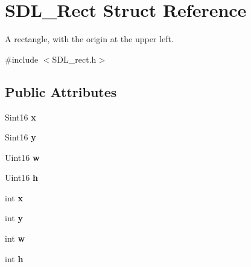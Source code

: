 \hypertarget{structSDL__Rect}{\section{S\+D\+L\+\_\+\+Rect Struct Reference}
\label{structSDL__Rect}
}


A rectangle, with the origin at the upper left.  




{\ttfamily \#include $<$S\+D\+L\+\_\+rect.\+h$>$}

\subsection*{Public Attributes}
\begin{DoxyCompactItemize}
\item 
\hypertarget{structSDL__Rect_a85418d94621dd6855805c4b5c7bf6482}{Sint16 {\bfseries x}}\label{structSDL__Rect_a85418d94621dd6855805c4b5c7bf6482}

\item 
\hypertarget{structSDL__Rect_a822694af8ddca5fd0d5d94e47106ab85}{Sint16 {\bfseries y}}\label{structSDL__Rect_a822694af8ddca5fd0d5d94e47106ab85}

\item 
\hypertarget{structSDL__Rect_a56b7be5738fb6fab86881534a814c45e}{Uint16 {\bfseries w}}\label{structSDL__Rect_a56b7be5738fb6fab86881534a814c45e}

\item 
\hypertarget{structSDL__Rect_a0a17d46b320af8063b746153348edd72}{Uint16 {\bfseries h}}\label{structSDL__Rect_a0a17d46b320af8063b746153348edd72}

\item 
\hypertarget{structSDL__Rect_a85418d94621dd6855805c4b5c7bf6482}{int {\bfseries x}}\label{structSDL__Rect_a85418d94621dd6855805c4b5c7bf6482}

\item 
\hypertarget{structSDL__Rect_a822694af8ddca5fd0d5d94e47106ab85}{int {\bfseries y}}\label{structSDL__Rect_a822694af8ddca5fd0d5d94e47106ab85}

\item 
\hypertarget{structSDL__Rect_a56b7be5738fb6fab86881534a814c45e}{int {\bfseries w}}\label{structSDL__Rect_a56b7be5738fb6fab86881534a814c45e}

\item 
\hypertarget{structSDL__Rect_a0a17d46b320af8063b746153348edd72}{int {\bfseries h}}\label{structSDL__Rect_a0a17d46b320af8063b746153348edd72}

\end{DoxyCompactItemize}


